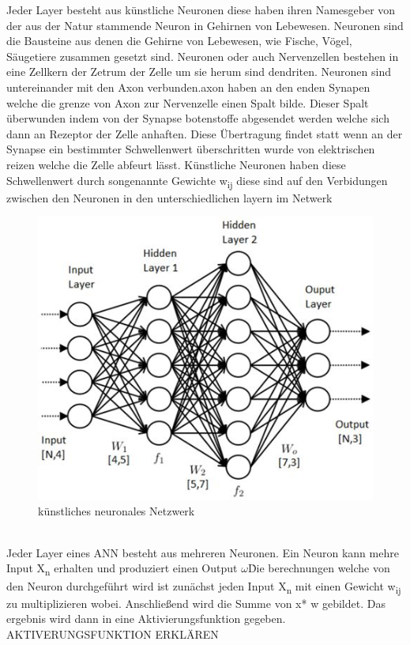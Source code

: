 \documentclass{llncs}
\begin{document}
Jeder Layer besteht aus künstliche Neuronen diese haben ihren Namesgeber von der aus der Natur stammende Neuron in Gehirnen von Lebewesen. Neuronen sind die Bausteine aus denen die Gehirne von Lebewesen, wie Fische, Vögel, Säugetiere zusammen gesetzt sind. Neuronen oder auch Nervenzellen bestehen in eine Zellkern der Zetrum der Zelle um sie herum sind dendriten. Neuronen sind untereinander mit den Axon verbunden.axon haben an den enden Synapen welche die grenze von Axon zur Nervenzelle einen Spalt bilde. Dieser Spalt überwunden indem von der Synapse botenstoffe abgesendet werden welche sich dann an Rezeptor der Zelle anhaften. Diese Übertragung findet statt wenn an der Synapse ein bestimmter Schwellenwert überschritten wurde von elektrischen reizen welche die Zelle abfeurt lässt. Künstliche Neuronen haben diese Schwellenwert durch songenannte Gewichte w\textsubscript{ij} diese sind auf den Verbidungen zwischen den Neuronen in den unterschiedlichen layern im Netwerk
\begin{figure}[htbp] 
	\centering
	\includegraphics[width=1.0\textwidth]{neuronalesnetzwerk.jpg}
	\caption{künstliches neuronales Netzwerk}
	\label{fig:Bild1}
\end{figure}
\\
Jeder Layer eines ANN besteht aus mehreren Neuronen. Ein Neuron \theta kann mehre Input X\textsubscript{n} erhalten und produziert einen Output $\omega$\. Die berechnungen welche von den Neuron durchgeführt wird ist zunächst jeden Input X\textsubscript{n} mit einen Gewicht w\textsubscript{ij} zu multiplizieren wobei. Anschließend wird die Summe von x* w gebildet. Das ergebnis wird dann in eine Aktivierungsfunktion gegeben. AKTIVERUNGSFUNKTION ERKLÄREN
\end{document}

